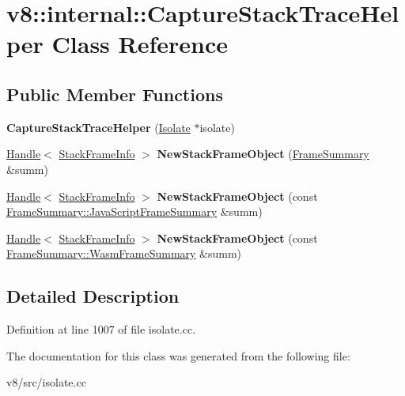 \hypertarget{classv8_1_1internal_1_1CaptureStackTraceHelper}{}\section{v8\+:\+:internal\+:\+:Capture\+Stack\+Trace\+Helper Class Reference}
\label{classv8_1_1internal_1_1CaptureStackTraceHelper}
\subsection*{Public Member Functions}
\begin{DoxyCompactItemize}
\item 
\mbox{\label{classv8_1_1internal_1_1CaptureStackTraceHelper_a6a936c4f93242b79e493333494215dbf}} 
{\bfseries Capture\+Stack\+Trace\+Helper} (\mbox{\hyperlink{classv8_1_1internal_1_1Isolate}{Isolate}} $\ast$isolate)
\item 
\mbox{\label{classv8_1_1internal_1_1CaptureStackTraceHelper_a259d29b13d43b8bf034f5e07ea642857}} 
\mbox{\hyperlink{classv8_1_1internal_1_1Handle}{Handle}}$<$ \mbox{\hyperlink{classv8_1_1internal_1_1StackFrameInfo}{Stack\+Frame\+Info}} $>$ {\bfseries New\+Stack\+Frame\+Object} (\mbox{\hyperlink{classv8_1_1internal_1_1FrameSummary}{Frame\+Summary}} \&summ)
\item 
\mbox{\label{classv8_1_1internal_1_1CaptureStackTraceHelper_a4ca56247ebc0723a5d2037baa0090d25}} 
\mbox{\hyperlink{classv8_1_1internal_1_1Handle}{Handle}}$<$ \mbox{\hyperlink{classv8_1_1internal_1_1StackFrameInfo}{Stack\+Frame\+Info}} $>$ {\bfseries New\+Stack\+Frame\+Object} (const \mbox{\hyperlink{classv8_1_1internal_1_1FrameSummary_1_1JavaScriptFrameSummary}{Frame\+Summary\+::\+Java\+Script\+Frame\+Summary}} \&summ)
\item 
\mbox{\label{classv8_1_1internal_1_1CaptureStackTraceHelper_af17f83d2f7577d83e1fa704ba762909e}} 
\mbox{\hyperlink{classv8_1_1internal_1_1Handle}{Handle}}$<$ \mbox{\hyperlink{classv8_1_1internal_1_1StackFrameInfo}{Stack\+Frame\+Info}} $>$ {\bfseries New\+Stack\+Frame\+Object} (const \mbox{\hyperlink{classv8_1_1internal_1_1FrameSummary_1_1WasmFrameSummary}{Frame\+Summary\+::\+Wasm\+Frame\+Summary}} \&summ)
\end{DoxyCompactItemize}


\subsection{Detailed Description}


Definition at line 1007 of file isolate.\+cc.



The documentation for this class was generated from the following file\+:\begin{DoxyCompactItemize}
\item 
v8/src/isolate.\+cc\end{DoxyCompactItemize}
